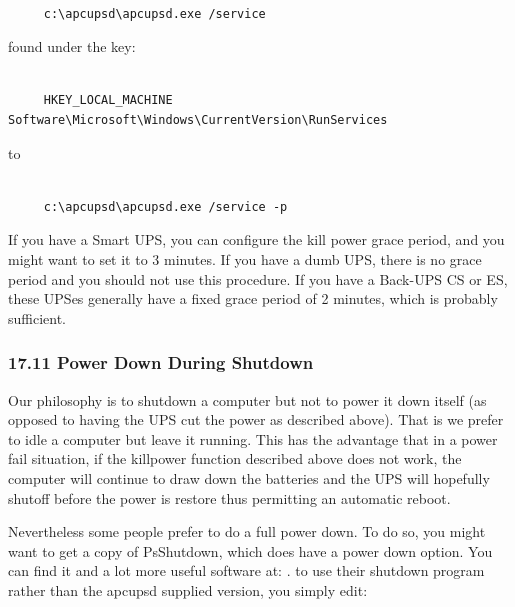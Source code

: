 {{{{{{{{{{\footnotesize
\begin{verbatim}
     
     c:\apcupsd\apcupsd.exe /service
\end{verbatim}
\normalsize

found under the key: 

\footnotesize
\begin{verbatim}
     
     HKEY_LOCAL_MACHINE Software\Microsoft\Windows\CurrentVersion\RunServices
\end{verbatim}
\normalsize

to 

\footnotesize
\begin{verbatim}
     
     c:\apcupsd\apcupsd.exe /service -p
\end{verbatim}
\normalsize

If you have a Smart UPS, you can configure the kill power grace period, and
you might want to set it to 3 minutes. If you have a dumb UPS, there is no
grace period and you should not use this procedure. If you have a Back-UPS CS
or ES, these UPSes generally have a fixed grace period of 2 minutes, which is
probably sufficient. 

\label{Power-Down-During-Shutdown}

\subsubsection*{17.11 Power Down During Shutdown}

\label{index-Windows_002c-Power-down-184}
\label{index-Power-down_002c-Windows-185}
Our philosophy is to shutdown a computer but not to power it down itself (as
opposed to having the UPS cut the power as described above). That is we prefer
to idle a computer but leave it running. This has the advantage that in a
power fail situation, if the killpower function described above does not work,
the computer will continue to draw down the batteries and the UPS will
hopefully shutoff before the power is restore thus permitting an automatic
reboot.  

Nevertheless some people prefer to do a full power down. To do so, you might
want to get a copy of PsShutdown, which does have a power down option. You can
find it and a lot more useful software at: 
. to use their shutdown program
rather than the apcupsd supplied version, you simply edit: 

}}}}}}}}}}
